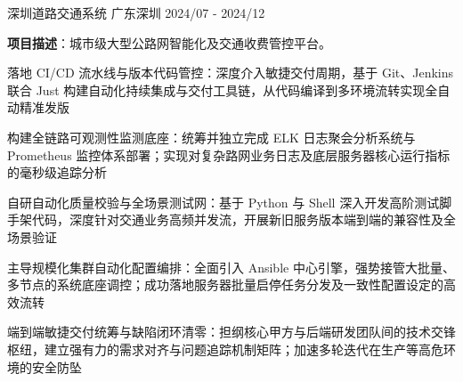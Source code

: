 

\begin{cventries}

  \cventry
    {} %
    {深圳道路交通系统} %
    {广东深圳} %
    {2024/07 - 2024/12} %
    {
      \begin{cvitems} %
        \item {\textbf{项目描述}：城市级大型公路网智能化及交通收费管控平台。}
        \item {落地 CI/CD 流水线与版本代码管控：深度介入敏捷交付周期，基于 Git、Jenkins 联合 Just 构建自动化持续集成与交付工具链，从代码编译到多环境流转实现全自动精准发版}
        \item {构建全链路可观测性监测底座：统筹并独立完成 ELK 日志聚会分析系统与 Prometheus 监控体系部署；实现对复杂路网业务日志及底层服务器核心运行指标的毫秒级追踪分析}
        \item {自研自动化质量校验与全场景测试网：基于 Python 与 Shell 深入开发高阶测试脚手架代码，深度针对交通业务高频并发流，开展新旧服务版本端到端的兼容性及全场景验证}
        \item {主导规模化集群自动化配置编排：全面引入 Ansible 中心引擎，强势接管大批量、多节点的系统底座调控；成功落地服务器批量启停任务分发及一致性配置设定的高效流转}
        \item {端到端敏捷交付统筹与缺陷闭环清零：担纲核心甲方与后端研发团队间的技术交锋枢纽，建立强有力的需求对齐与问题追踪机制矩阵；加速多轮迭代在生产等高危环境的安全防坠}
      \end{cvitems}
    }


\end{cventries}
